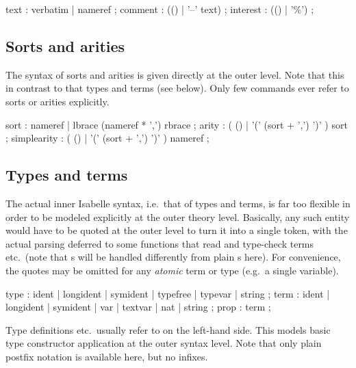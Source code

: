 \begin{rail}
  text : verbatim | nameref
  ;
  comment : (() | '--' text)
  ;
  interest : (() | '\%')
  ;
\end{rail}


\subsection{Sorts and arities}

The syntax of sorts and arities is given directly at the outer level.  Note
that this in contrast to that types and terms (see below).  Only few commands
ever refer to sorts or arities explicitly.

\begin{rail}
  sort : nameref | lbrace (nameref * ',') rbrace
  ;
  arity : ( () | '(' (sort + ',') ')' ) sort
  ;
  simplearity : ( () | '(' (sort + ',') ')' ) nameref
  ;
\end{rail}


\subsection{Types and terms}

The actual inner Isabelle syntax, i.e.\ that of types and terms, is far too
flexible in order to be modeled explicitly at the outer theory level.
Basically, any such entity would have to be quoted at the outer level to turn
it into a single token, with the actual parsing deferred to some functions
that read and type-check terms etc.\ (note that s will be
handled differently from plain s here).  For convenience, the
quotes may be omitted for any \emph{atomic} term or type (e.g.\ a single
variable).

\begin{rail}
  type : ident | longident | symident | typefree | typevar | string
  ;
  term : ident | longident | symident | var | textvar | nat | string
  ;
  prop : term
  ;
\end{rail}

Type definitions etc.\ usually refer to  on the
left-hand side.  This models basic type constructor application at the outer
syntax level.  Note that only plain postfix notation is available here, but no
infixes.

